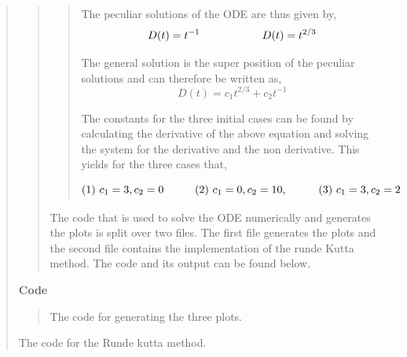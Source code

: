 \begin{quote}
\begin{quote}
\begin{quote}
The peculiar solutions of the ODE are thus given by,
\begin{equation}
D(t) = t^{-1} \hspace*{2cm} D(t) = t^{2/3}
\end{equation}

The general solution is the super position of the peculiar solutions  and can therefore be written as,
\begin{equation}
D(t) = c_{1} t^{2/3} + c_2 t^{-1}
\end{equation}

The constants for the three initial cases can be found by calculating the derivative of the above equation and solving the system for the derivative and the non derivative.  This yields for the three cases that, %

\begin{equation}
\text{(1) } c_1 = 3, c_2 = 0 \hspace*{1cm} \text{(2) } c_1 =0, c_2 = 10, \hspace*{1cm} \text{(3) } c_1 = 3, c_2 = 2 
\end{equation}

\end{quote}

The code that is used to solve the ODE numerically and generates the plots is split over two files. The first file generates the plots and the second file contains the implementation of the runde Kutta method. The code and its output can be found below. %
\newpage
 
\end{quote}

\textbf{Code}

\begin{quote}
The code for generating the three plots.
\centering

\end{quote}

The code for the Runde kutta method.
\centering

\newpage


\end{quote}
